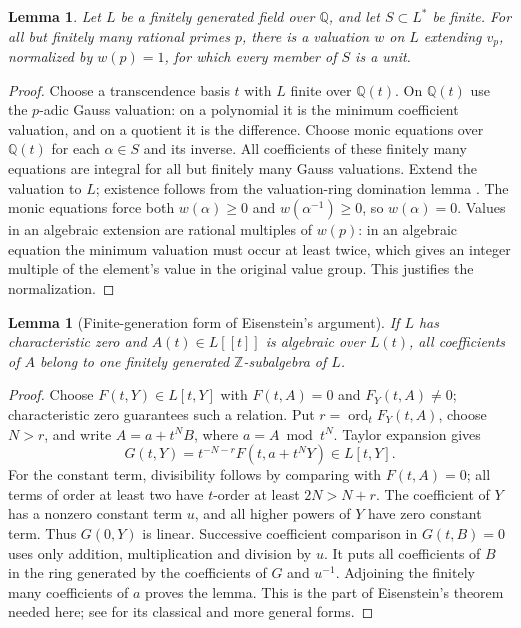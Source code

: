 \documentclass[11pt]{article}
\numberwithin{equation}{section}
\newtheorem{lemma}[theorem]{Lemma}
\theoremstyle{definition}
\theoremstyle{remark}
\newcommand{\Q}{\mathbb Q}
\newcommand{\Z}{\mathbb Z}
\newcommand{\ord}{\operatorname{ord}}
\begin{document}
\begin{lemma}\label{lem:goodvaluations}
Let $L$ be a finitely generated field over $\Q$, and let $S\subset L^*$
be finite. For all but finitely many rational primes $p$, there is a
valuation $w$ on $L$ extending $v_p$, normalized by $w(p)=1$, for which
every member of $S$ is a unit.
\end{lemma}
\begin{proof}
Choose a transcendence basis $t$ with $L$ finite over $\Q(t)$.
On $\Q(t)$ use the $p$-adic Gauss valuation: on a polynomial it is
the minimum coefficient valuation, and on a quotient it is the difference.
Choose monic equations over $\Q(t)$ for each $\alpha\in S$ and its
inverse. All coefficients of these finitely many equations are integral
for all but finitely many Gauss valuations. Extend the valuation to $L$;
existence follows from the valuation-ring domination lemma
\cite[Lemma~10.50.2]{Stacks}. The monic equations force both
$w(\alpha)\geq0$ and $w(\alpha^{-1})\geq0$, so $w(\alpha)=0$.
Values in an algebraic extension are rational multiples of $w(p)$:
in an algebraic equation the minimum valuation must occur at least
twice, which gives an integer multiple of the element's value in
the original value group. This justifies the normalization.
\end{proof}

\begin{lemma}[Finite-generation form of Eisenstein's argument]
\label{lem:eisenstein}
If $L$ has characteristic zero and $A(t)\in L[[t]]$ is algebraic over
$L(t)$, all coefficients of $A$ belong to one finitely generated
$\Z$-subalgebra of $L$.
\end{lemma}
\begin{proof}
Choose $F(t,Y)\in L[t,Y]$ with $F(t,A)=0$ and $F_Y(t,A)\ne0$;
characteristic zero guarantees such a relation. Put
$r=\ord_tF_Y(t,A)$, choose $N>r$, and write
$A=a+t^NB$, where $a=A\bmod t^N$. Taylor expansion gives
\[
 G(t,Y)=t^{-N-r}F(t,a+t^NY)\in L[t,Y].
\]
For the constant term, divisibility follows by comparing with $F(t,A)=0$;
all terms of order at least two have $t$-order at least $2N>N+r$.
The coefficient of $Y$ has a nonzero constant term $u$, and all higher
powers of $Y$ have zero constant term. Thus $G(0,Y)$ is linear.
Successive coefficient comparison in $G(t,B)=0$ uses only addition,
multiplication and division by $u$. It puts all coefficients of $B$
in the ring generated by the coefficients of $G$ and $u^{-1}$.
Adjoining the finitely many coefficients of $a$ proves the lemma.
This is the part of Eisenstein's theorem needed here; see
\cite{Rond} for its classical and more general forms.
\end{proof}
\end{document}
